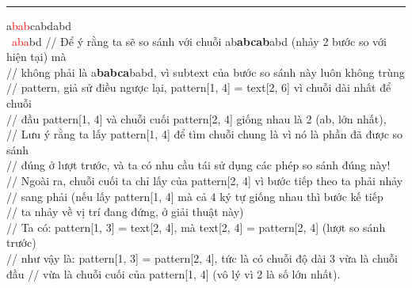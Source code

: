\documentclass[a4paper,11pt]{article}
\begin{document}
\begin{enumerate}
			\vspace*{2mm}
			\hrule
			a\textcolor{red}{bab}cabdabd\\
			\textcolor{white}{a}\textcolor{red}{aba}bd 			\hspace*{1.6cm} // Để ý rằng ta sẽ so sánh với chuỗi ab\textbf{abcab}abd (nhảy 2 bước so với hiện tại) mà \\
																							\hspace*{2.9cm} // không phải là a\textbf{babca}babd, vì subtext của bước so sánh này luôn không trùng\\
																							\hspace*{2.9cm} //  pattern, giả sử điều ngược lại, pattern[1, 4] = text[2, 6] vì chuỗi dài nhất để chuỗi \\
																							\hspace*{2.9cm} // đầu pattern[1, 4] và chuỗi cuối pattern[2, 4] giống nhau là 2 (ab, lớn nhất),  \\
																							\hspace*{2.9cm} // Lưu ý rằng ta lấy pattern[1, 4] để tìm chuỗi chung là vì nó là phần đã được so sánh \\
																							\hspace*{2.9cm} // đúng ở lượt trước, và ta có nhu cầu tái sử dụng các phép so sánh đúng này! \\
																							\hspace*{2.9cm} // Ngoài ra, chuỗi cuối ta chỉ lấy của pattern[2, 4] vì bước tiếp theo ta phải nhảy \\
																							\hspace*{2.9cm} // sang phải (nếu lấy pattern[1, 4] mà cả 4 ký tự giống nhau thì bước kế tiếp  \\
																							\hspace*{2.9cm} // ta nhảy về vị trí đang đứng, ở giải thuật này) \\
																							\hspace*{2.9cm} // Ta có: pattern[1, 3] = text[2, 4], mà text[2, 4] = pattern[2, 4] (lượt so sánh trước) \\
																							\hspace*{2.9cm} // như vậy là: pattern[1, 3] = pattern[2, 4], tức là có chuỗi độ dài 3 vừa là chuỗi đầu 
																							\hspace*{2.9cm} // vừa là chuỗi cuối của pattern[1, 4] (vô lý vì 2 là số lớn nhất).


\end{enumerate}
\end{document}
